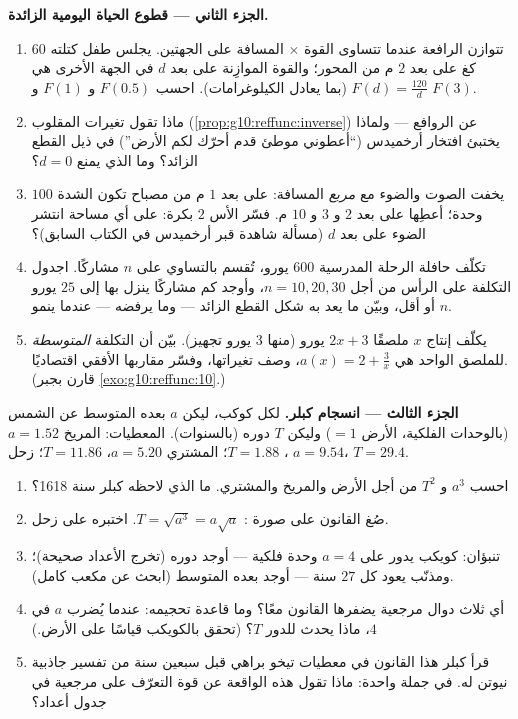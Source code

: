 \begin{problem}
\medskip
\noindent\textbf{الجزء الثاني --- قطوع الحياة اليومية الزائدة.}
\begin{enumerate}[resume]
  \item تتوازن الرافعة عندما تتساوى القوة $\times$ المسافة
        على الجهتين. يجلس طفل كتلته $60$ كغ على بعد $2$ م من
        المحور؛ والقوة الموازِنة على بعد $d$ في الجهة الأخرى
        هي $F(d) = \frac{120}{d}$ (بما يعادل الكيلوغرامات).
        احسب $F(0.5)$ و $F(1)$ و $F(3)$.
  \item ماذا تقول تغيرات  المقلوب
        (\cref{prop:g10:reffunc:inverse}) عن الروافع ---
        ولماذا يختبئ افتخار أرخميدس (``أعطوني موطئ قدم
        أحرّك لكم الأرض'') في ذيل
        القطع الزائد؟ وما الذي يمنع $d = 0$؟
  \item يخفت الصوت والضوء مع \emph{مربع}
        المسافة: على بعد $1$ م من مصباح تكون الشدة $100$
        وحدة؛ أعطِها على بعد $2$ و $3$ و $10$ م. فسّر
        الأس $2$ بكرة: على أي مساحة انتشر الضوء
        على بعد $d$ (مسألة شاهدة قبر أرخميدس في الكتاب السابق)؟
  \item تكلّف حافلة الرحلة المدرسية $600$ يورو، تُقسم
        بالتساوي على $n$ مشاركًا. اجدول التكلفة على
        الرأس من أجل $n = 10, 20, 30$، وأوجد كم مشاركًا
        ينزل بها إلى $25$ يورو أو أقل، وبيّن ما يعد به شكل
        القطع الزائد --- وما يرفضه --- عندما ينمو $n$.
  \item يكلّف إنتاج $x$ ملصقًا $2x + 3$ يورو (منها $3$ يورو
        تجهيز). بيّن أن التكلفة \emph{المتوسطة} للملصق الواحد هي
        $a(x) = 2 + \frac3x$، وصف تغيراتها،
        وفسّر مقاربها الأفقي اقتصاديًا.
        (قارن بجبر \cref{exo:g10:reffunc:10}.)
\end{enumerate}

\medskip
\noindent\textbf{الجزء الثالث --- انسجام كبلر.}
لكل كوكب، ليكن $a$ بعده المتوسط عن الشمس (بالوحدات
الفلكية، الأرض $= 1$) وليكن $T$ دوره (بالسنوات).
المعطيات: المريخ $a = 1.52$، $T = 1.88$؛ المشتري $a = 5.20$،
$T = 11.86$؛ زحل $a = 9.54$، $T = 29.4$.
\begin{enumerate}[resume]
  \item احسب $a^3$ و $T^2$ من أجل الأرض والمريخ والمشتري.
        ما الذي لاحظه كبلر سنة 1618؟
  \item صُغ القانون على صورة : $T = \sqrt{a^3} = a\sqrt a$.
        اختبره على زحل.
  \item تنبؤان: كويكب يدور على $a = 4$ وحدة فلكية ---
        أوجد دوره (تخرج الأعداد صحيحة)؛ ومذنّب
        يعود كل $27$ سنة --- أوجد بعده المتوسط
        (ابحث عن مكعب كامل).
  \item أي ثلاث دوال مرجعية يضفرها القانون
        معًا؟ وما قاعدة تحجيمه: عندما يُضرب $a$
        في $4$، ماذا يحدث للدور $T$؟ (تحقق بالكويكب
        قياسًا على الأرض.)
  \item قرأ كبلر هذا القانون في معطيات تيخو براهي قبل
        سبعين سنة من تفسير جاذبية نيوتن له. في جملة
        واحدة: ماذا تقول هذه الواقعة عن قوة
        التعرّف على  مرجعية في جدول أعداد؟
\end{enumerate}


\end{problem}
